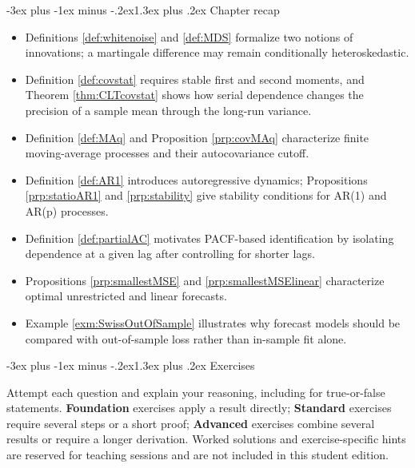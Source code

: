 \documentclass[
  11pt,
]{book}
\makeatletter
\providecommand{\tightlist}{%
  \setlength{\itemsep}{0pt}\setlength{\parskip}{0pt}}
\renewcommand\section{\@startsection{section}{1}{\z@}
  {-3ex plus -1ex minus -.2ex}{1.3ex plus .2ex}
  {\normalfont\Large\bfseries\color{TextbookInk}}}
\theoremstyle{definition}
\theoremstyle{definition}
\theoremstyle{definition}
\theoremstyle{definition}
\theoremstyle{remark}
\makeatother
\begin{document}

\section{Chapter recap}\label{time-series-recap}

\begin{recapbox}

\begin{itemize}
\tightlist
\item
  Definitions \ref{def:whitenoise} and \ref{def:MDS} formalize two notions of innovations; a martingale difference may remain conditionally heteroskedastic.
\item
  Definition \ref{def:covstat} requires stable first and second moments, and Theorem \ref{thm:CLTcovstat} shows how serial dependence changes the precision of a sample mean through the long-run variance.
\item
  Definition \ref{def:MAq} and Proposition \ref{prp:covMAq} characterize finite moving-average processes and their autocovariance cutoff.
\item
  Definition \ref{def:AR1} introduces autoregressive dynamics; Propositions \ref{prp:statioAR1} and \ref{prp:stability} give stability conditions for AR(1) and AR(p) processes.
\item
  Definition \ref{def:partialAC} motivates PACF-based identification by isolating dependence at a given lag after controlling for shorter lags.
\item
  Propositions \ref{prp:smallestMSE} and \ref{prp:smallestMSElinear} characterize optimal unrestricted and linear forecasts.
\item
  Example \ref{exm:SwissOutOfSample} illustrates why forecast models should be compared with out-of-sample loss rather than in-sample fit alone.
\end{itemize}

\end{recapbox}

\clearpage

\section{Exercises}\label{time-series-exercises}

Attempt each question and explain your reasoning, including for true-or-false statements. \textbf{Foundation} exercises apply a result directly; \textbf{Standard} exercises require several steps or a short proof; \textbf{Advanced} exercises combine several results or require a longer derivation. Worked solutions and exercise-specific hints are reserved for teaching sessions and are not included in this student edition.
\end{document}

